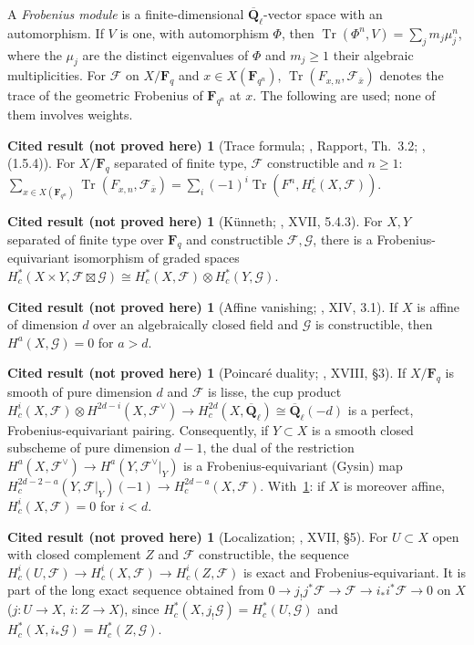 \documentclass[11pt,a4paper]{article}
\theoremstyle{plain}
\theoremstyle{definition}
\newtheorem{cited}[theorem]{Cited result (not proved here)}
\theoremstyle{remark}
\newcommand{\Fq}{\mathbf F_q}
\newcommand{\Ql}{\overline{\mathbf Q}_\ell}
\newcommand{\F}{\mathcal F}
\newcommand{\Tr}{\operatorname{Tr}}
\begin{document}
A \emph{Frobenius module} is a finite-dimensional $\Ql$-vector space with an automorphism. If $V$ is one, with
automorphism $\Phi$, then $\Tr(\Phi^n,V)=\sum_j m_j\mu_j^n$, where the $\mu_j$ are the distinct eigenvalues of $\Phi$ and
$m_j\ge1$ their algebraic multiplicities. For $\F$ on $X/\Fq$ and $x\in X(\mathbf F_{q^n})$, $\Tr(F_{x,n},\F_{\bar x})$
denotes the trace of the geometric Frobenius of $\mathbf F_{q^n}$ at $x$. The following are used; none of them involves
weights.

\begin{cited}[Trace formula; \cite{SGA4h}, Rapport, Th.~3.2; \cite{WeilI}, (1.5.4)]\label{cit:trace}
For $X/\Fq$ separated of finite type, $\F$ constructible and $n\ge1$:
$\sum_{x\in X(\mathbf F_{q^n})}\Tr(F_{x,n},\F_{\bar x})=\sum_i(-1)^i\Tr(F^n,H^i_c(X,\F))$.
\end{cited}

\begin{cited}[K\"unneth; \cite{SGA4}, XVII, 5.4.3]\label{cit:kunneth}
For $X,Y$ separated of finite type over $\Fq$ and constructible $\F,\mathcal G$, there is a Frobenius-equivariant
isomorphism of graded spaces $H^*_c(X\times Y,\F\boxtimes\mathcal G)\cong H^*_c(X,\F)\otimes H^*_c(Y,\mathcal G)$.
\end{cited}

\begin{cited}[Affine vanishing; \cite{SGA4}, XIV, 3.1]\label{cit:artin}
If $X$ is affine of dimension $d$ over an algebraically closed field and $\mathcal G$ is constructible, then
$H^a(X,\mathcal G)=0$ for $a>d$.
\end{cited}

\begin{cited}[Poincar\'e duality; \cite{SGA4}, XVIII, \S3]\label{cit:duality}
If $X/\Fq$ is smooth of pure dimension $d$ and $\F$ is lisse, the cup product
$H^i_c(X,\F)\otimes H^{2d-i}(X,\F^\vee)\to H^{2d}_c(X,\Ql)\cong\Ql(-d)$ is a perfect, Frobenius-equivariant pairing.
Consequently, if $Y\subset X$ is a smooth closed subscheme of pure dimension $d-1$, the dual of the restriction
$H^a(X,\F^\vee)\to H^a(Y,\F^\vee|_Y)$ is a Frobenius-equivariant (Gysin) map
$H^{2d-2-a}_c(Y,\F|_Y)(-1)\to H^{2d-a}_c(X,\F)$. With~\ref{cit:artin}: if $X$ is moreover affine, $H^i_c(X,\F)=0$ for
$i<d$.
\end{cited}

\begin{cited}[Localization; \cite{SGA4}, XVII, \S5]\label{cit:local}
For $U\subset X$ open with closed complement $Z$ and $\F$ constructible, the sequence
$H^i_c(U,\F)\to H^i_c(X,\F)\to H^i_c(Z,\F)$ is exact and Frobenius-equivariant. It is part of the long exact sequence
obtained from $0\to j_!j^*\F\to\F\to i_*i^*\F\to0$ on $X$ ($j:U\to X$, $i:Z\to X$), since
$H^*_c(X,j_!\mathcal G)=H^*_c(U,\mathcal G)$ and $H^*_c(X,i_*\mathcal G)=H^*_c(Z,\mathcal G)$.
\end{cited}
\end{document}
